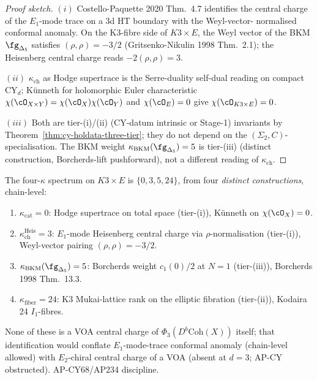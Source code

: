 \begin{proof}[Proof sketch]
$(i)$ Costello-Paquette 2020 Thm.~4.7 identifies the central charge of
the $E_1$-mode trace on a $3$d HT boundary with the Weyl-vector-
normalised conformal anomaly. On the K3-fibre side of $K3 \times E$,
the Weyl vector of the BKM $\fg_{\Delta_5}$ satisfies
$(\rho, \rho) = -3/2$ (Gritsenko-Nikulin 1998 Thm.~2.1); the
Heisenberg central charge reads $-2(\rho, \rho) = 3$.

$(ii)$ $\kappa_{\mathrm{ch}}$ as Hodge supertrace is the Serre-duality
self-dual reading on compact CY$_d$; K\"unneth for holomorphic
Euler characteristic $\chi(\cO_{X \times Y}) = \chi(\cO_X) \chi(\cO_Y)$
and $\chi(\cO_E) = 0$ give $\chi(\cO_{K3 \times E}) = 0$.

$(iii)$ Both are tier-(i)/(ii) (CY-datum intrinsic or Stage-1) invariants
by Theorem~\ref{thm:cy-holdata-three-tier}; they do not depend on the
$(\Sigma_2, C)$-specialisation. The BKM weight
$\kappa_{\mathrm{BKM}}(\fg_{\Delta_5}) = 5$ is tier-(iii) (distinct
construction, Borcherds-lift pushforward), not a different reading of
$\kappa_{\mathrm{ch}}$.
\end{proof}

\begin{remark}
\label{rem:agent12-four-kappa-on-k3e}
The four-$\kappa$ spectrum on $K3 \times E$ is
$\{0, 3, 5, 24\}$, from four \emph{distinct constructions},
chain-level:
\begin{enumerate}
\item $\kappa_{\mathrm{cat}} = 0$: Hodge supertrace on total space
(tier-(i)), K\"unneth on $\chi(\cO_X) = 0$.
\item $\kappa_{\mathrm{ch}}^{\mathrm{Heis}} = 3$: $E_1$-mode Heisenberg
central charge via $\rho$-normalisation (tier-(i)), Weyl-vector pairing
$(\rho, \rho) = -3/2$.
\item $\kappa_{\mathrm{BKM}}(\fg_{\Delta_5}) = 5$: Borcherds weight
$c_1(0)/2$ at $N = 1$ (tier-(iii)), Borcherds 1998 Thm.~13.3.
\item $\kappa_{\mathrm{fiber}} = 24$: K3 Mukai-lattice rank on the
elliptic fibration (tier-(ii)), Kodaira 24 $I_1$-fibres.
\end{enumerate}
None of these is a VOA central charge of $\Phi_3(D^b\mathrm{Coh}(X))$
itself; that identification would conflate $E_1$-mode-trace conformal
anomaly (chain-level allowed) with $E_2$-chiral central charge of a
VOA (absent at $d = 3$; AP-CY obstructed). AP-CY68/AP234 discipline.
\end{remark}

